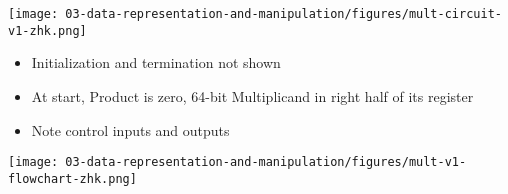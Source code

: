 
\ifnum{}
\newpage
\fi
\begin{frame}[fragile]
\begin{multicols}{2}
\texttt{[image: 03-data-representation-and-manipulation/figures/mult-circuit-v1-zhk.png]}


{\footnotesize
\begin{itemize}
\item Initialization and termination not shown
\item At start, Product is zero, 64-bit Multiplicand in right half of
its register
\item Note control inputs and outputs
\end{itemize}
}
\columnbreak

  \texttt{[image: 03-data-representation-and-manipulation/figures/mult-v1-flowchart-zhk.png]}   
\end{multicols}
\BNotes\ifnum{}
~%
\fi\ENotes
\end{frame}



